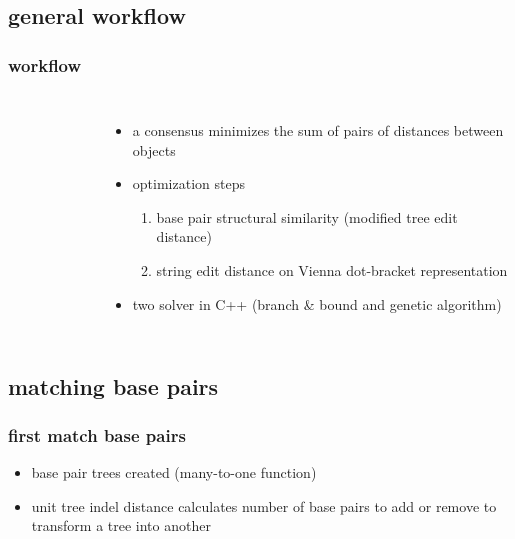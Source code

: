 \documentclass{beamer}
\begin{document}
\subsection{general workflow}
\begin{frame}
	\frametitle{workflow}
	\begin{columns}
		\centering
		\begin{figure}[!htb]
			\resizebox{1.\textwidth}{!}{}
		\end{figure} 
        
        \begin{itemize}
        		\item a consensus minimizes the sum of pairs of distances between objects
        		\item optimization steps
        		\begin{enumerate}
        		        			\item base pair structural similarity (modified tree edit distance)
        			\item string edit distance on Vienna dot-bracket representation
        		\end{enumerate}
			\item two solver in C++ (branch \& bound and genetic algorithm)
        \end{itemize}
         \end{columns}
         
\end{frame} 


\subsection{matching base pairs}
\begin{frame}
	\frametitle{first match base pairs}
	\begin{figure}[!htb]
	\centering
	\resizebox{0.4\textwidth}{!}{}
	\end{figure} 
	
	\begin{itemize}
		\item base pair trees created (many-to-one function)
		\item unit tree indel distance calculates number of base pairs to add or remove to transform a tree into another
	\end{itemize}
	

\end{frame}
\end{document}

